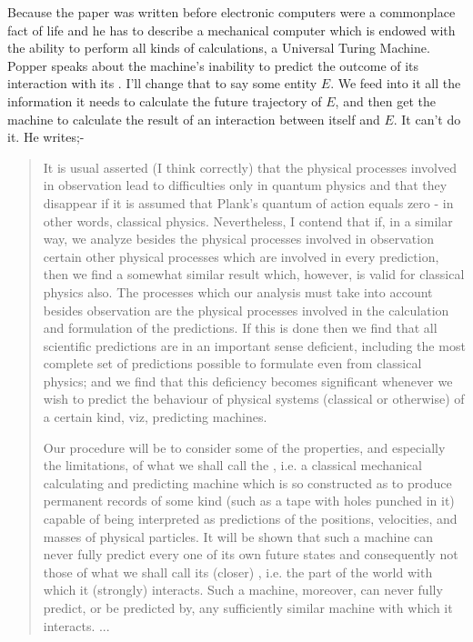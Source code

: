 Because the paper was written before electronic computers were a commonplace fact of life and he has to describe a mechanical computer which is endowed with the ability to perform all kinds of calculations, a Universal Turing Machine. Popper speaks about the machine's inability to predict the outcome of its interaction with its . I'll change that to say some entity $E$. We feed into it all the information it needs to calculate the future trajectory of $E$, and then get the machine to calculate the result of an interaction between itself and $E$. It can't do it. He writes;-
\begin{quotation}
  It is usual asserted (I think correctly) that the physical processes involved in observation lead to difficulties only in quantum physics and that they disappear if it is assumed that Plank's quantum of action equals zero - in other words, classical physics. Nevertheless, I contend that if, in a similar way, we analyze besides the physical processes involved in observation certain other physical processes which are involved in every prediction, then we find a somewhat similar result which, however, is valid for classical physics also. The processes which our analysis must take into account besides observation are the physical processes involved in the calculation and formulation of the predictions. If this is done then we find that all scientific predictions are in an important sense deficient, including the most complete set of predictions possible to formulate even from classical physics; and we find that this deficiency becomes significant whenever we wish to predict the behaviour of physical systems (classical or otherwise) of a certain kind, viz, predicting machines.

  Our procedure will be to consider some of the properties, and especially the limitations, of what we shall call the , i.e. a classical mechanical calculating and predicting machine which is so constructed as to produce permanent records of some kind (such as a tape with holes punched in it) capable of being interpreted as predictions of the positions, velocities, and masses of physical particles. It will be shown that such a machine can never fully predict every one of its own future states and consequently not those of what we shall call its (closer) , i.e. the part of the world with which it (strongly) interacts. Such a machine, moreover, can never fully predict, or be predicted by, any sufficiently similar machine with which it interacts. ...
  \par
  \hfill \autocite[p.~118]{Popper1950a}
\end{quotation}
